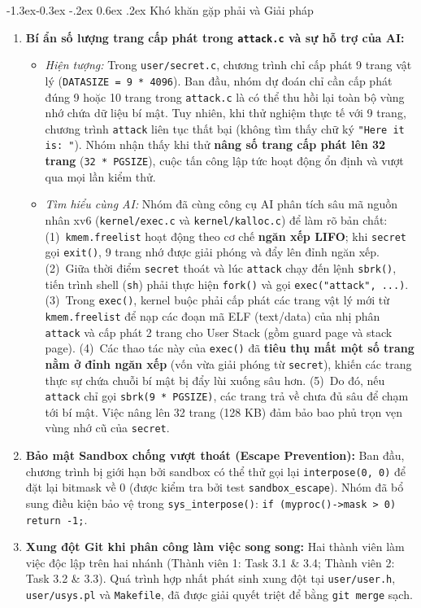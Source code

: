 \documentclass[11pt,a4paper]{article}
\makeatletter
\renewcommand\subsection{\@startsection{subsection}{2}{\z@}%
                                     {-1.3ex\@plus -0.3ex \@minus -.2ex}%
                                     {0.6ex \@plus .2ex}%
                                     {\normalfont\normalsize\bfseries}}
\makeatother
\begin{document}
\subsection{Khó khăn gặp phải và Giải pháp}
\begin{enumerate}
    \item \textbf{Bí ẩn số lượng trang cấp phát trong \texttt{attack.c} và sự hỗ trợ của AI:}
    \begin{itemize}
        \item \textit{Hiện tượng:} Trong \texttt{user/secret.c}, chương trình chỉ cấp phát 9 trang vật lý (\texttt{DATASIZE = 9 * 4096}). Ban đầu, nhóm dự đoán chỉ cần cấp phát đúng 9 hoặc 10 trang trong \texttt{attack.c} là có thể thu hồi lại toàn bộ vùng nhớ chứa dữ liệu bí mật. Tuy nhiên, khi thử nghiệm thực tế với 9 trang, chương trình \texttt{attack} liên tục thất bại (không tìm thấy chữ ký \texttt{"Here it is: "}). Nhóm nhận thấy khi thử \textbf{nâng số trang cấp phát lên 32 trang} (\texttt{32 * PGSIZE}), cuộc tấn công lập tức hoạt động ổn định và vượt qua mọi lần kiểm thử.
        \item \textit{Tìm hiểu cùng AI:} Nhóm đã cùng công cụ AI phân tích sâu mã nguồn nhân xv6 (\texttt{kernel/exec.c} và \texttt{kernel/kalloc.c}) để làm rõ bản chất:
        (1)~\texttt{kmem.freelist} hoạt động theo cơ chế \textbf{ngăn xếp LIFO}; khi \texttt{secret} gọi \texttt{exit()}, 9 trang nhớ được giải phóng và đẩy lên đỉnh ngăn xếp.
        (2)~Giữa thời điểm \texttt{secret} thoát và lúc \texttt{attack} chạy đến lệnh \texttt{sbrk()}, tiến trình shell (\texttt{sh}) phải thực hiện \texttt{fork()} và gọi \texttt{exec("attack", ...)}.
        (3)~Trong \texttt{exec()}, kernel buộc phải cấp phát các trang vật lý mới từ \texttt{kmem.freelist} để nạp các đoạn mã ELF (text/data) của nhị phân \texttt{attack} và cấp phát 2 trang cho User Stack (gồm guard page và stack page).
        (4)~Các thao tác này của \texttt{exec()} đã \textbf{tiêu thụ mất một số trang nằm ở đỉnh ngăn xếp} (vốn vừa giải phóng từ \texttt{secret}), khiến các trang thực sự chứa chuỗi bí mật bị đẩy lùi xuống sâu hơn.
        (5)~Do đó, nếu \texttt{attack} chỉ gọi \texttt{sbrk(9 * PGSIZE)}, các trang trả về chưa đủ sâu để chạm tới bí mật. Việc nâng lên 32 trang (128 KB) đảm bảo bao phủ trọn vẹn vùng nhớ cũ của \texttt{secret}.
    \end{itemize}
    \item \textbf{Bảo mật Sandbox chống vượt thoát (Escape Prevention):} Ban đầu, chương trình bị giới hạn bởi sandbox có thể thử gọi lại \texttt{interpose(0, 0)} để đặt lại bitmask về 0 (được kiểm tra bởi test \texttt{sandbox\_escape}). Nhóm đã bổ sung điều kiện bảo vệ trong \texttt{sys\_interpose()}: \texttt{if (myproc()->mask > 0) return -1;}.
    \item \textbf{Xung đột Git khi phân công làm việc song song:} Hai thành viên làm việc độc lập trên hai nhánh (Thành viên 1: Task 3.1 \& 3.4; Thành viên 2: Task 3.2 \& 3.3). Quá trình hợp nhất phát sinh xung đột tại \texttt{user/user.h}, \texttt{user/usys.pl} và \texttt{Makefile}, đã được giải quyết triệt để bằng \texttt{git merge} sạch.
\end{enumerate}
\end{document}
